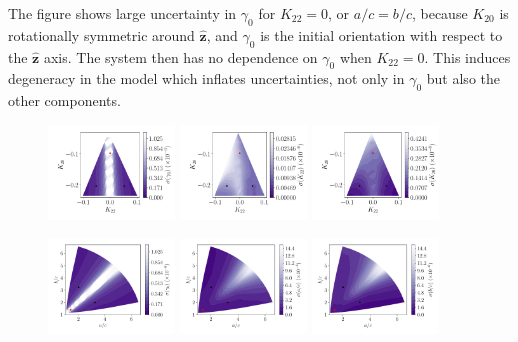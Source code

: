 \documentclass[fleqn,usenatbib]{mnras}
\newcommand{\unit}[1]{\bm{\hat{#1}}}
\begin{document}
The figure shows large uncertainty in $\gamma_0$ for $K_{22}=0$, or $a/c=b/c$, because $K_{20}$ is rotationally symmetric around $\unit z$, and $\gamma_0$ is the initial orientation with respect to the $\unit z$ axis. The system then has no dependence on $\gamma_0$ when $K_{22}=0$. This induces degeneracy in the model which inflates uncertainties, not only in $\gamma_0$ but also the other components.

\begin{figure}
  \includegraphics[width=0.3\textwidth]{figs/probe-space-theta-1-sigma.pdf}\hfill
  \includegraphics[width=0.3\textwidth]{figs/probe-space-theta-2-sigma.pdf}\hfill
  \includegraphics[width=0.3\textwidth]{figs/probe-space-theta-3-sigma.pdf}

  \includegraphics[width=0.3\textwidth]{figs/probe-space-ab-1-sigma.pdf}\hfill
  \includegraphics[width=0.3\textwidth]{figs/probe-space-ab-a-sigma.pdf}\hfill
  \includegraphics[width=0.3\textwidth]{figs/probe-space-ab-b-sigma.pdf}


\end{figure}
\end{document}
